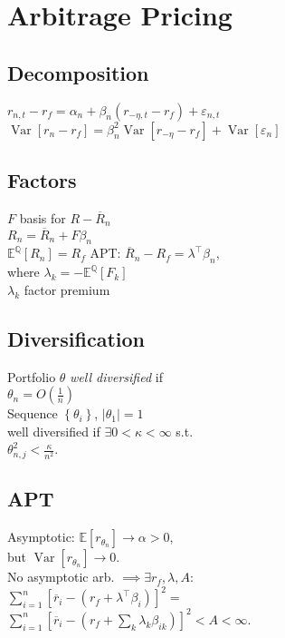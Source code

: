 \section{Arbitrage Pricing}
	\subsection*{Decomposition}
	$r_{n,t} - r_{f} = \alpha_{n} + \beta_{n}\left(r_{-\eta,t} - r_{f}\right) + \varepsilon_{n, t}$\\
	$\operatorname{Var}\left[r_{n} - r_{f}\right] = \beta_{n}^{2}\operatorname{Var}\left[r_{-\eta} - r_{f}\right] + \operatorname{Var}\left[\varepsilon_{n}\right]$
	
	\subsection*{Factors}
	$F$ basis for $R - \overline{R}_{n}$\\
	$R_{n} = \overline{R}_{n} + F\beta_{n}$\\
	$\mathbb{E}^{\mathbb{Q}}\left[R_{n}\right] = R_{f}$
	APT: $\overline{R}_{n} - R_{f} = \lambda^{\intercal}\beta_{n}$,\\
	where $\lambda_{k} = -\mathbb{E}^{\mathbb{Q}}\left[F_{k}\right]$\\
	$\lambda_{k}$ factor premium
	
	\subsection*{Diversification}
	Portfolio $\theta$ \emph{well diversified} if\\
	$\theta_{n} = O\left(\frac{1}{n}\right)$\\
	Sequence $\left\{\theta_{i}\right\}$, $\left|\theta_{1}\right| = 1$\\
	well diversified if $\exists 0<\kappa<\infty$ s.t.\\
	$\theta_{n,j}^{2}<\frac{\kappa}{n^{2}}$.
	
	\subsection*{APT}
	Asymptotic: $\mathbb{E}\left[r_{\theta_{n}}\right]\to\alpha > 0$,\\
	but $\operatorname{Var}\left[r_{\theta_{n}}\right]\to 0$.\\
	No asymptotic arb. $\implies\exists r_{f}, \lambda, A:$\\
	$\sum_{i = 1}^{n}\left[\overline{r}_{i} - \left(r_{f} + \lambda^{\intercal}\beta_{i}\right)\right]^{2} =$\\
	$\sum_{i = 1}^{n}\left[\overline{r}_{i} - \left(r_{f} + \sum_{k}\lambda_{k}\beta_{ik}\right)\right]^{2} < A < \infty$.
	